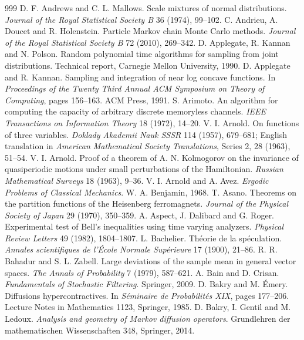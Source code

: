 \begin{thebibliography}{999}
 D. F. Andrews and C. L. Mallows. Scale mixtures of normal distributions. \emph{Journal of the Royal Statistical Society B} 36 (1974), 99--102.
 C. Andrieu, A. Doucet and R. Holenstein. Particle Markov chain Monte Carlo methods. \emph{Journal of the Royal Statistical Society B} 72 (2010), 269--342.
 D. Applegate, R. Kannan and N. Polson. Random polynomial time algorithms for sampling from joint distributions. Technical report, Carnegie Mellon University, 1990.
 D. Applegate and R. Kannan. Sampling and integration of near log concave functions. In \emph{Proceedings of the Twenty Third Annual ACM Symposium on Theory of Computing}, pages 156--163. ACM Press, 1991.
 S. Arimoto. An algorithm for computing the capacity of arbitrary discrete memoryless channels. \emph{IEEE Transactions on Information Theory} 18 (1972), 14--20.
 V. I. Arnold. On functions of three variables. \emph{Doklady Akademii Nauk SSSR} 114 (1957), 679--681; English translation in \emph{American Mathematical Society Translations}, Series 2, 28 (1963), 51--54.
 V. I. Arnold. Proof of a theorem of A. N. Kolmogorov on the invariance of quasiperiodic motions under small perturbations of the Hamiltonian. \emph{Russian Mathematical Surveys} 18 (1963), 9--36.
 V. I. Arnold and A. Avez. \emph{Ergodic Problems of Classical Mechanics}. W. A. Benjamin, 1968.
 T. Asano. Theorems on the partition functions of the Heisenberg ferromagnets. \emph{Journal of the Physical Society of Japan} 29 (1970), 350--359.
 A. Aspect, J. Dalibard and G. Roger. Experimental test of Bell's inequalities using time varying analyzers. \emph{Physical Review Letters} 49 (1982), 1804--1807.
 L. Bachelier. Th\'eorie de la sp\'eculation. \emph{Annales scientifiques de l'\'Ecole Normale Sup\'erieure} 17 (1900), 21--86.
 R. R. Bahadur and S. L. Zabell. Large deviations of the sample mean in general vector spaces. \emph{The Annals of Probability} 7 (1979), 587--621.
 A. Bain and D. Crisan. \emph{Fundamentals of Stochastic Filtering}. Springer, 2009.
 D. Bakry and M. \'Emery. Diffusions hypercontractives. In \emph{S\'eminaire de Probabilit\'es XIX}, pages 177--206. Lecture Notes in Mathematics 1123, Springer, 1985.
 D. Bakry, I. Gentil and M. Ledoux. \emph{Analysis and geometry of Markov diffusion operators}. Grundlehren der mathematischen Wissenschaften 348, Springer, 2014.

\end{thebibliography}
